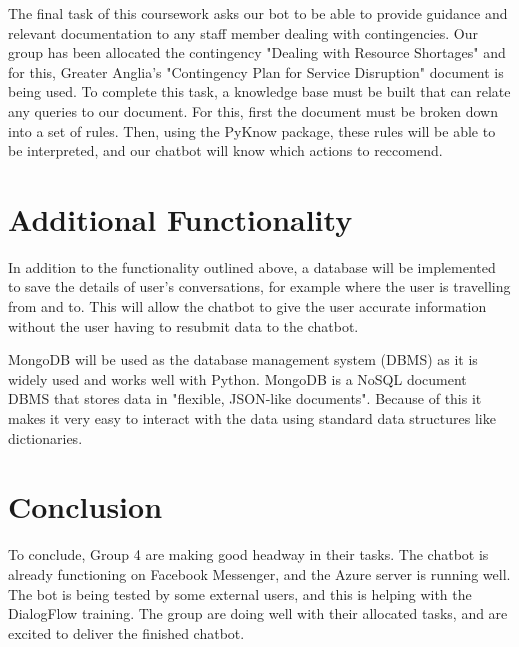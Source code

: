 \documentclass[12pt,a4paper]{article}
\begin{document}
    The final task of this coursework asks our bot to be able to provide guidance and relevant documentation to any staff member dealing with contingencies. Our group has been allocated the contingency "Dealing with Resource Shortages" and for this, Greater Anglia's "Contingency Plan for Service Disruption" document is being used. To complete this task, a knowledge base must be built that can relate any queries to our document. For this, first the document must be broken down into a set of rules. Then, using the PyKnow package, these rules will be able to be interpreted, and our chatbot will know which actions to reccomend.
    
    \section*{Additional Functionality}
    In addition to the functionality outlined above, a database will be implemented to save the details of user's conversations, for example where the user is travelling from and to. This will allow the chatbot to give the user accurate information without the user having to resubmit data to the chatbot.
    
    MongoDB will be used as the database management system (DBMS) as it is widely used and works well with Python. MongoDB is a NoSQL document DBMS that stores data in "flexible, JSON-like documents"\citep{mongodb_2017}. Because of this it makes it very easy to interact with the data using standard data structures like dictionaries.
    
    \section*{Conclusion}
    
    To conclude, Group 4 are making good headway in their tasks. The chatbot is already functioning on Facebook Messenger, and the Azure server is running well. The bot is being tested by some external users, and this is helping with the DialogFlow training. The group are doing well with their allocated tasks, and are excited to deliver the finished chatbot.
    
    
    
    
\end{document}
